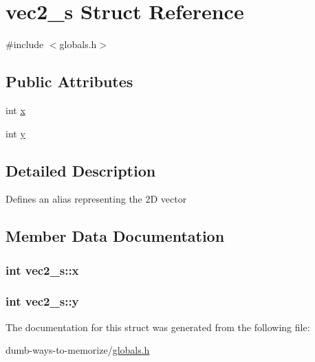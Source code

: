 \hypertarget{structvec2__s}{}\section{vec2\+\_\+s Struct Reference}
\label{structvec2__s}


{\ttfamily \#include $<$globals.\+h$>$}

\subsection*{Public Attributes}
\begin{DoxyCompactItemize}
\item 
int \hyperlink{structvec2__s_a14c0d24a6a985df0a5d877617e57fccc}{x}
\item 
int \hyperlink{structvec2__s_af62f11cb31d16c75021e9abcc35c9118}{y}
\end{DoxyCompactItemize}


\subsection{Detailed Description}
Defines an alias representing the 2D vector 

\subsection{Member Data Documentation}
\subsubsection[{\texorpdfstring{x}{x}}]{\setlength{\rightskip}{0pt plus 5cm}int vec2\+\_\+s\+::x}\hypertarget{structvec2__s_a14c0d24a6a985df0a5d877617e57fccc}{}\label{structvec2__s_a14c0d24a6a985df0a5d877617e57fccc}
\subsubsection[{\texorpdfstring{y}{y}}]{\setlength{\rightskip}{0pt plus 5cm}int vec2\+\_\+s\+::y}\hypertarget{structvec2__s_af62f11cb31d16c75021e9abcc35c9118}{}\label{structvec2__s_af62f11cb31d16c75021e9abcc35c9118}


The documentation for this struct was generated from the following file\+:\begin{DoxyCompactItemize}
\item 
dumb-\/ways-\/to-\/memorize/\hyperlink{globals_8h}{globals.\+h}\end{DoxyCompactItemize}
